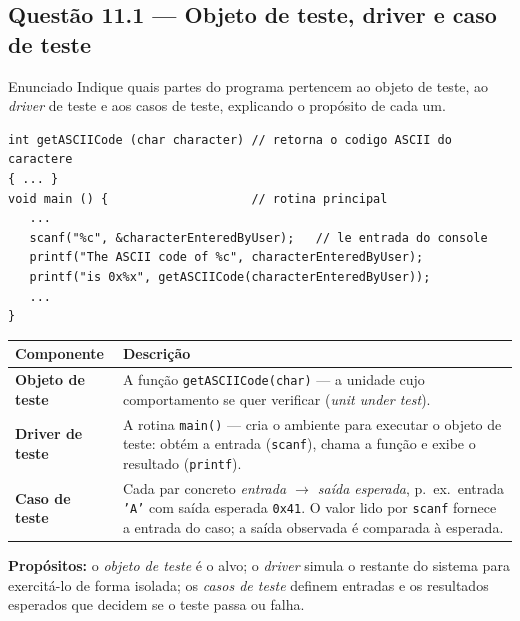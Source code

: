 \documentclass[11pt,a4paper]{article}
\begin{document}
\subsection*{Questão 11.1 — Objeto de teste, driver e caso de teste}
\begin{questao}{Enunciado}
Indique quais partes do programa pertencem ao objeto de teste, ao \emph{driver}
de teste e aos casos de teste, explicando o propósito de cada um.
\begin{lstlisting}
int getASCIICode (char character) // retorna o codigo ASCII do caractere
{ ... }
void main () {                    // rotina principal
   ...
   scanf("%c", &characterEnteredByUser);   // le entrada do console
   printf("The ASCII code of %c", characterEnteredByUser);
   printf("is 0x%x", getASCIICode(characterEnteredByUser));
   ...
}
\end{lstlisting}
\end{questao}
\begin{resposta}
\begin{center}\small
\begin{tabular}{@{}>{\bfseries}p{3.0cm}p{11.4cm}@{}}
\toprule
Componente & Descrição \\
\midrule
Objeto de teste & A função \texttt{getASCIICode(char)} — a unidade cujo comportamento se quer verificar (\emph{unit under test}). \\
Driver de teste & A rotina \texttt{main()} — cria o ambiente para executar o objeto de teste: obtém a entrada (\texttt{scanf}), chama a função e exibe o resultado (\texttt{printf}). \\
Caso de teste & Cada par concreto \emph{entrada $\to$ saída esperada}, p.\ ex.\ entrada \texttt{'A'} com saída esperada \texttt{0x41}. O valor lido por \texttt{scanf} fornece a entrada do caso; a saída observada é comparada à esperada. \\
\bottomrule
\end{tabular}
\end{center}
\textbf{Propósitos:} o \emph{objeto de teste} é o alvo; o \emph{driver} simula o
restante do sistema para exercitá-lo de forma isolada; os \emph{casos de teste}
definem entradas e os resultados esperados que decidem se o teste passa ou falha.
\end{resposta}

\end{document}
